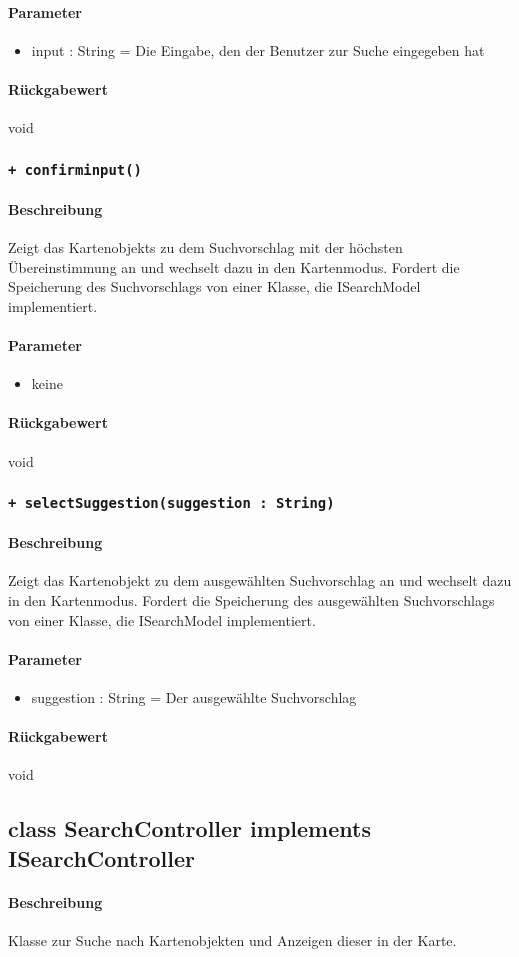 \paragraph*{Parameter}
\begin{itemize}
    \item input : String = Die Eingabe, den der Benutzer zur Suche eingegeben hat
\end{itemize}
\paragraph*{Rückgabewert}
void

\subsubsection{\texttt{+ confirminput()}}%
\paragraph*{Beschreibung}
Zeigt das Kartenobjekts zu dem Suchvorschlag mit der höchsten Übereinstimmung an und wechselt dazu in den Kartenmodus.
Fordert die Speicherung des Suchvorschlags von einer Klasse, die ISearchModel implementiert.
\paragraph*{Parameter}
\begin{itemize}
    \item keine
\end{itemize}
\paragraph*{Rückgabewert}
void

\subsubsection{\texttt{+ selectSuggestion(suggestion : String)}}%
\paragraph*{Beschreibung}
Zeigt das Kartenobjekt zu dem ausgewählten Suchvorschlag an und wechselt dazu in den Kartenmodus.
Fordert die Speicherung des ausgewählten Suchvorschlags von einer Klasse, die ISearchModel implementiert.
\paragraph*{Parameter}
\begin{itemize}
    \item suggestion : String = Der ausgewählte Suchvorschlag
\end{itemize}
\paragraph*{Rückgabewert}
void


\subsection{class SearchController implements ISearchController}
\paragraph*{Beschreibung}
Klasse zur Suche nach Kartenobjekten und Anzeigen dieser in der Karte.